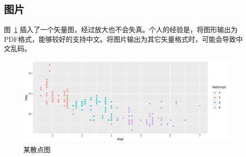 \documentclass[zihao = -4, linespread = 1.5]{ctexart}
\begin{document}
\subsection{图片}
图~\ref{fig:scatter} 插入了一个矢量图，经过放大也不会失真。个人的经验是，将图形输出为PDF格式，能够较好的支持中文。将图片输出为其它矢量格式时，可能会导致中文乱码。
\begin{figure}[htpb]
  \centering
  \includegraphics[width=\textwidth]{picture/scatter.pdf}
  \caption{某散点图  \protect\footnotemark} %
  \label{fig:scatter}
\end{figure}

\end{document}
